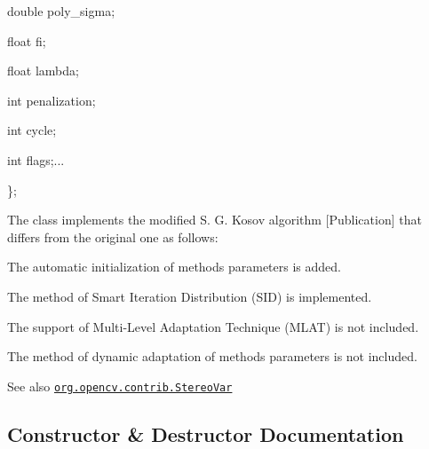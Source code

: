 {\ttfamily }

{\ttfamily double poly\+\_\+sigma;}

{\ttfamily }

{\ttfamily }

{\ttfamily float fi;}

{\ttfamily }

{\ttfamily }

{\ttfamily float lambda;}

{\ttfamily }

{\ttfamily }

{\ttfamily int penalization;}

{\ttfamily }

{\ttfamily }

{\ttfamily int cycle;}

{\ttfamily }

{\ttfamily }

{\ttfamily int flags;...}

{\ttfamily }

{\ttfamily }

{\ttfamily \};}

{\ttfamily }

{\ttfamily }

{\ttfamily The class implements the modified S. G. Kosov algorithm \mbox{[}Publication\mbox{]} that differs from the original one as follows\+: }


\begin{DoxyItemize}
\item The automatic initialization of method\textquotesingle{}s parameters is added. 
\item The method of Smart Iteration Distribution (S\+ID) is implemented. 
\item The support of Multi-\/\+Level Adaptation Technique (M\+L\+AT) is not included. 
\item The method of dynamic adaptation of method\textquotesingle{}s parameters is not included. 
\end{DoxyItemize}

\begin{DoxySeeAlso}{See also}
\href{http://docs.opencv.org/modules/contrib/doc/stereo.html#stereovar}{\tt org.\+opencv.\+contrib.\+Stereo\+Var} 
\end{DoxySeeAlso}


\subsection{Constructor \& Destructor Documentation}
\mbox{\label{classorg_1_1opencv_1_1contrib_1_1_stereo_var_a2fefe4ed9e2c7f8a32f6332c0f80c90f}} 
